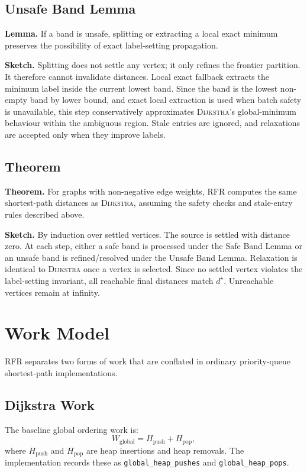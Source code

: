 \documentclass[11pt]{article}
\newcommand{\RFR}{\textsc{RFR}}
\newcommand{\Dijkstra}{\textsc{Dijkstra}}
\begin{document}
\subsection{Unsafe Band Lemma}

\textbf{Lemma.} If a band is unsafe, splitting or extracting a local exact minimum preserves the possibility of exact label-setting propagation.

\textbf{Sketch.} Splitting does not settle any vertex; it only refines the frontier partition. It therefore cannot invalidate distances. Local exact fallback extracts the minimum label inside the current lowest band. Since the band is the lowest non-empty band by lower bound, and exact local extraction is used when batch safety is unavailable, this step conservatively approximates \Dijkstra{}'s global-minimum behaviour within the ambiguous region. Stale entries are ignored, and relaxations are accepted only when they improve labels.

\subsection{Theorem}

\textbf{Theorem.} For graphs with non-negative edge weights, \RFR{} computes the same shortest-path distances as \Dijkstra{}, assuming the safety checks and stale-entry rules described above.

\textbf{Sketch.} By induction over settled vertices. The source is settled with distance zero. At each step, either a safe band is processed under the Safe Band Lemma or an unsafe band is refined/resolved under the Unsafe Band Lemma. Relaxation is identical to \Dijkstra{} once a vertex is selected. Since no settled vertex violates the label-setting invariant, all reachable final distances match $d^\star$. Unreachable vertices remain at infinity.

\section{Work Model}
\label{sec:work}

\RFR{} separates two forms of work that are conflated in ordinary priority-queue shortest-path implementations.

\subsection{Dijkstra Work}

The baseline global ordering work is:
\[
  W_{\text{global}} = H_{\text{push}} + H_{\text{pop}},
\]
where $H_{\text{push}}$ and $H_{\text{pop}}$ are heap insertions and heap removals. The implementation records these as \texttt{global\_heap\_pushes} and \texttt{global\_heap\_pops}.
\end{document}
